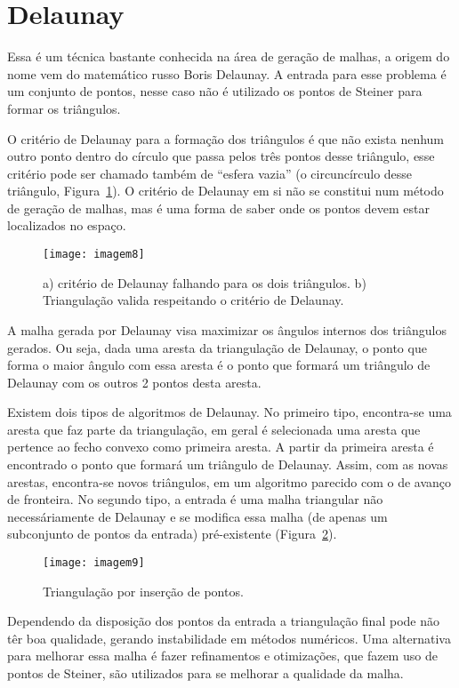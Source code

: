 \section{Delaunay}

Essa é um técnica bastante conhecida na área de geração de malhas, a origem do nome vem do matemático russo Boris Delaunay. A entrada para esse problema é um conjunto de pontos, nesse caso não é utilizado os pontos de Steiner para formar os triângulos.

O critério de Delaunay para a formação dos triângulos é que não exista nenhum outro ponto dentro do círculo que passa pelos três pontos desse triângulo, esse critério pode ser chamado também de “esfera vazia” (o circuncírculo desse triângulo, Figura~\ref{fig:imagem8}). O critério de Delaunay em si não se constitui num método de geração de malhas, mas é uma forma de saber onde os pontos devem estar localizados no espaço.

 \begin{figure}[htbp]
     \centering
     \texttt{[image: imagem8]}
     \caption{a) critério de Delaunay falhando para os dois triângulos. b) Triangulação valida respeitando o critério de Delaunay.} 
     \label{fig:imagem8}
 \end{figure}

A malha gerada por Delaunay visa maximizar os ângulos internos dos triângulos gerados. Ou seja, dada uma aresta da triangulação de Delaunay, o ponto que forma o maior ângulo com essa aresta é o ponto que formará um triângulo de Delaunay com os outros 2 pontos desta aresta.

Existem dois tipos de algoritmos de Delaunay. No primeiro tipo, encontra-se uma aresta que faz parte da triangulação, em geral é selecionada uma aresta que pertence ao fecho convexo como primeira aresta. A partir da primeira aresta é encontrado o ponto que formará um triângulo de Delaunay. Assim, com as novas arestas, encontra-se novos triângulos, em um algoritmo parecido com o de avanço de fronteira. No segundo tipo, a entrada é uma malha triangular não necessáriamente de Delaunay e se modifica essa malha (de apenas um subconjunto de pontos da entrada) pré-existente (Figura~\ref{fig:imagem9}).

 \begin{figure}[htbp]
     \centering
     \texttt{[image: imagem9]}
     \caption{Triangulação por inserção de pontos. \cite{bib:Freitas10}} 
     \label{fig:imagem9}
 \end{figure}

 Dependendo da disposição dos pontos da entrada a triangulação final pode não têr boa qualidade, gerando instabilidade em métodos numéricos. Uma alternativa para melhorar essa malha é fazer refinamentos e otimizações, que fazem uso de pontos de Steiner, são utilizados para se melhorar a qualidade da malha.

